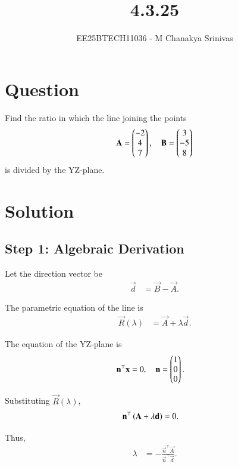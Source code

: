 \documentclass[journal]{IEEEtran}
\begin{document}

\vspace{3cm}

\title{4.3.25}
\author{EE25BTECH11036 - M Chanakya Srinivas}
\maketitle

\renewcommand{\thetable}{\theenumi}
\setlength{\intextsep}{10pt}
\renewcommand\theequation{\arabic{equation}}



\section*{Question}
Find the ratio in which the line joining the points 
\[
\mathbf{A} = \begin{pmatrix}-2 \\ 4 \\ 7\end{pmatrix}, \quad 
\mathbf{B} = \begin{pmatrix}3 \\ -5 \\ 8\end{pmatrix}
\]
is divided by the YZ-plane.

\section*{Solution}

\subsection*{Step 1: Algebraic Derivation}
Let the direction vector be
\begin{align}
\vec{d} &= \vec{B} - \vec{A}.
\end{align}

The parametric equation of the line is
\begin{align}
\vec{R}(\lambda) &= \vec{A} + \lambda \vec{d}.
\end{align}

The equation of the YZ-plane is
\begin{align}
\mathbf{n}^\top \mathbf{x} &= 0, \quad 
\mathbf{n} = \begin{pmatrix}1 \\ 0 \\ 0\end{pmatrix}.
\end{align}

Substituting $\vec{R}(\lambda)$,
\begin{align}
\mathbf{n}^\top \left(\mathbf{A} + \lambda \mathbf{d}\right) &= 0.
\end{align}

Thus,
\begin{align}
\lambda &= -\frac{\vec{n}^\top \vec{A}}{\vec{n}^\top \vec{d}}.
\end{align}
\end{document}
